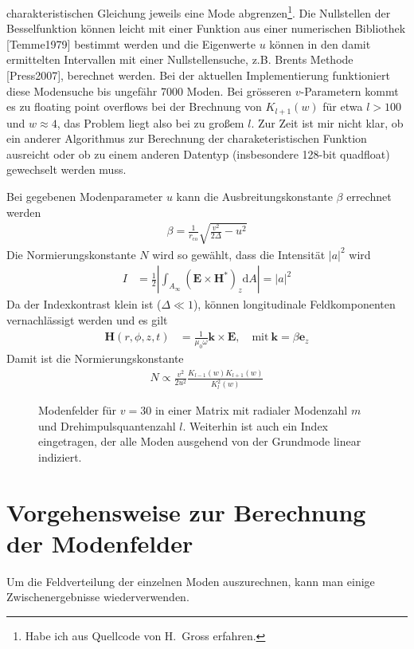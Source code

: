 \documentclass[DIV19,twocolumn]{scrartcl}
\newcommand{\vect}[1]{\mathbf{#1}}
\def\k{\vect k}
\def\e{\vect e}
\def\E{\vect E}
\def\H{\vect H}
\def\({\left(}
\def\){\right)}
\newcommand{\rco}{r_\textrm{co}}
\def\svgending{\ifx\pdfoutput\undefined%
  .eps_tex%
  \else%
  .pdf_tex%
  \fi}
\newcommand{\svginput}[2]{{\def\svgscale{#1}}}
\begin{document}
charakteristischen Gleichung jeweils eine Mode abgrenzen\footnote{Habe
  ich aus Quellcode von H.~Gross erfahren.}. Die Nullstellen der
Besselfunktion k\"onnen leicht mit einer Funktion aus einer
numerischen Bibliothek [Temme1979] bestimmt werden und die Eigenwerte
$u$ k\"onnen in den damit ermittelten Intervallen mit einer
Nullstellensuche, z.B. Brents Methode [Press2007], berechnet werden.
Bei der aktuellen Implementierung funktioniert diese Modensuche bis
ungef\"ahr 7000 Moden. Bei gr\"osseren $v$-Parametern kommt es zu
floating point overflows bei der Brechnung von $K_{l+1}(w)$ f\"ur etwa
$l>100$ und $w\approx 4$, das Problem liegt also bei zu gro\ss em
$l$. Zur Zeit ist mir nicht klar, ob ein anderer Algorithmus zur
Berechnung der charaketeristischen Funktion ausreicht oder ob zu einem
anderen Datentyp (insbesondere 128-bit quadfloat) gewechselt werden
muss.


Bei gegebenen Modenparameter $u$ kann die Ausbreitungskonstante
$\beta$ errechnet werden
\begin{align}
\beta = \frac{1}{\rco} \sqrt{\frac{v^2}{2\Delta} - u^2}
\end{align}
Die Normierungskonstante $N$ wird so gew\"ahlt, dass die Intensit\"at
$|a|^2$ wird
\begin{align}
  I &= \frac{1}{2}\left|\int_{A_\infty} \(\E\times\H^*\)_z  \textrm{d}A \right| = |a|^2
\end{align}
Da der Indexkontrast klein ist ($\Delta \ll 1$), k\"onnen longitudinale Feldkomponenten vernachl\"assigt werden und es gilt
\begin{align}
  \H(r,\phi,z,t) &= \frac{1}{\mu_0 \omega} \k \times \E, \quad\textrm{mit}\ \k = \beta \e_z
\end{align}
Damit ist die Normierungskonstante 
\begin{align}
  N \propto \frac{v^2}{2 u^2} \frac{K_{l-1}(w)K_{l+1}(w)}{K_l^2(w)}
\end{align}

\begin{figure}[hbtp]
  \centering
  \svginput{1}{modes}
  \caption{Modenfelder f\"ur $v=30$ in einer Matrix mit radialer
    Modenzahl $m$ und Drehimpulsquantenzahl $l$. Weiterhin ist auch
    ein Index eingetragen, der alle Moden ausgehend von der Grundmode
    linear indiziert.}
  \label{fig:fields}
\end{figure}
\section{Vorgehensweise zur Berechnung der Modenfelder}
Um die Feldverteilung der einzelnen Moden auszurechnen, kann man
einige Zwischenergebnisse wiederverwenden.
\end{document}
